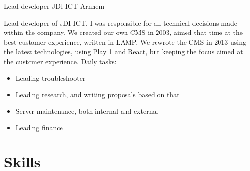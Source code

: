 \documentclass[11pt,a4paper]{moderncv}
\begin{document}
\vspace*{0.2\baselineskip}
{Lead developer}
{JDI ICT}
{Arnhem}
{}
{
    Lead developer of JDI ICT. I was responsible for all technical decisions made within the company.
    We created our own CMS in 2003, aimed that time at the best customer experience, written in LAMP.
    We rewrote the CMS in 2013 using the latest technologies, using Play 1 and React, but keeping the focus aimed at the customer experience.
    \newline{}%
    Daily tasks:%
    \begin{itemize}
        \item Leading troubleshooter
        \item Leading research, and writing proposals based on that
        \item Server maintenance, both internal and external
        \item Leading finance
    \end{itemize}
}

\section{Skills}
\end{document}

